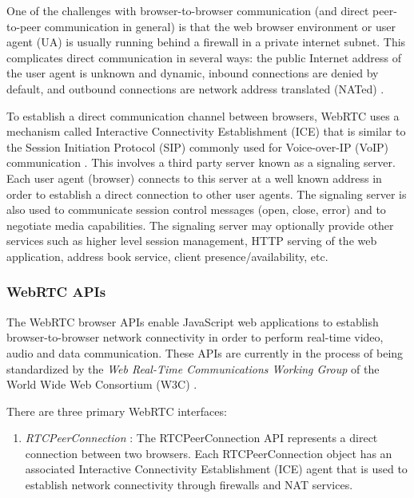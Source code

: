 \documentclass[9pt]{extarticle}
\begin{document}
\begin{multicols}{2}
One of the challenges with browser-to-browser communication (and
direct peer-to-peer communication in general) is that the web browser
environment or user agent (UA) is usually running behind a firewall in
a private internet subnet. This complicates direct communication in
several ways: the public Internet address of the user agent is unknown
and dynamic, inbound connections are denied by default, and outbound
connections are network address translated (NATed)
\cite[Section~3.4]{draft-rtcweb-transports}.

To establish a direct communication channel between browsers, WebRTC
uses a mechanism called Interactive Connectivity Establishment (ICE)
that is similar to the Session Initiation Protocol (SIP) commonly used
for Voice-over-IP (VoIP) communication \cite{RFC5245:ice}. This
involves a third party server known as a signaling server. Each user
agent (browser) connects to this server at a well known address in
order to establish a direct connection to other user agents. The
signaling server is also used to communicate session control messages
(open, close, error) and to negotiate media capabilities. %
The signaling server may optionally provide other services such as
higher level session management, HTTP serving of the web application,
address book service, client presence/availability, etc. %

\subsubsection{WebRTC APIs}

The WebRTC browser APIs enable JavaScript web applications
to establish browser-to-browser network connectivity in order to
perform real-time video, audio and data communication. These APIs are
currently in the process of being standardized by the \emph{Web
Real-Time Communications Working Group} of the World Wide Web
Consortium (W3C) \cite{webrtc:wg}.

There are three primary WebRTC interfaces:

\begin{enumerate}
\item \emph{RTCPeerConnection} \cite{webrtc:rtcpeerconnection:feb2015}:
    The RTCPeerConnection API represents a direct connection between
    two browsers. Each RTCPeerConnection object has an associated
    Interactive Connectivity Establishment (ICE) agent that is used to
    establish network connectivity through firewalls and NAT services.


\end{enumerate}
\end{multicols}
\end{document}
